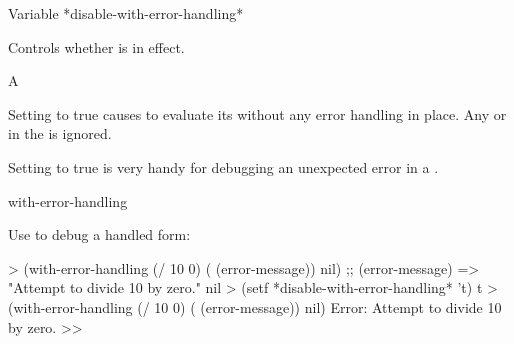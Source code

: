 \documentclass[10pt,twoside,english,pdftex]{article}
\begin{document}

\begin{functiondoc}{Variable}%
{*disable-with-error-handling*}{}%

\fnsyntax

\fnpurpose Controls whether  is
in effect.

\fnpackage {}

\fnmodule {}

\fnvaluetype A 

\fninitialvalue \nil

\fndescription Setting  to true
causes  to evaluate its
 without any error handling in place.  Any
 or  in the
 is ignored. 

Setting  to true is very handy
for debugging an unexpected error in a
 .

\begin{alsos}{with-error-handling}
\end{alsos}

\fnexample
{}%
% 
Use  to debug a handled form:
%
\W\supp
\begin{example}
  > (with-error-handling (/ 10 0) ( (error-message)) nil)
  ;;  (error-message) => "Attempt to divide 10 by zero."
  nil 
  > (setf *disable-with-error-handling* 't)
  t
  > (with-error-handling (/ 10 0) ( (error-message)) nil)
  Error: Attempt to divide 10 by zero.
  >>
\end{example}

\end{functiondoc}

\end{document}
